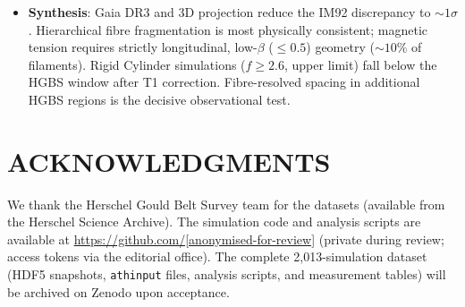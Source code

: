 \documentclass[twoside,twocolumn]{mnras}
\begin{document}
\begin{itemize}
    \item \textbf{Synthesis}: Gaia DR3 and 3D projection reduce the IM92 discrepancy to
    ${\sim}1\sigma$. Hierarchical fibre fragmentation is most physically consistent; magnetic
    tension requires strictly longitudinal, low-$\beta$ ($\leq0.5$) geometry (${\sim}10\%$ of
    filaments). Rigid Cylinder simulations ($f \geq 2.6$, upper limit) fall below the HGBS
    window after T1 correction. Fibre-resolved spacing in additional HGBS regions is the
    decisive observational test.

\end{itemize}

\section*{ACKNOWLEDGMENTS}

We thank the Herschel Gould Belt Survey team for the datasets (available from the
Herschel Science Archive). The simulation code and analysis scripts are available at
\url{https://github.com/[anonymised-for-review]} (private during review; access tokens
via the editorial office). The complete 2,013-simulation dataset (HDF5 snapshots,
\texttt{athinput} files, analysis scripts, and measurement tables) will be archived on
Zenodo upon acceptance.



\end{document}
